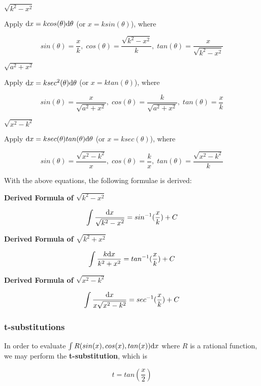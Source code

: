 \documentclass[a4paper,12pt]{article}
\begin{document}
\begin{alist}
  \item $\sqrt{k^{2}-x^{2}}$\s

  Apply $\mathrm{d} x=kcos(\theta)\mathrm{d} \theta$ (or $x=ksin(\theta)$), where

  $$sin(\theta)=\frac{x}{k},\; cos(\theta)=\frac{\sqrt{k^{2}-x^{2}}}{k},\; tan(\theta)=\frac{x}{\sqrt{k^{2}-x^{2}}}$$

  \item $\sqrt{a^{2}+x^{2}}$\s

  Apply $\mathrm{d} x=ksec^{2}(\theta)\mathrm{d} \theta$ (or $x=ktan(\theta)$), where

  $$sin(\theta)=\frac{x}{\sqrt{a^{2}+x^{2}}},\; cos(\theta)=\frac{k}{\sqrt{a^{2}+x^{2}}},\; tan(\theta)=\frac{x}{k}$$

  \item $\sqrt{x^{2}-k^{2}}$\s

  Apply $\mathrm{d} x=ksec(\theta)tan(\theta)\mathrm{d} \theta$ (or $x=ksec(\theta)$), where

  $$sin(\theta)=\frac{\sqrt{x^{2}-k^{2}}}{x},\; cos(\theta)=\frac{k}{x},\; tan(\theta)=\frac{\sqrt{x^{2}-k^{2}}}{k}$$
\end{alist}

With the above equations, the following formulae is derived:

\begin{alist}
  \item \textbf{Derived Formula of $\sqrt{k^{2}-x^{2}}$}

  $$\int\frac{\mathrm{d} x}{\sqrt{k^{2}-x^{2}}}=sin^{-1}(\frac{x}{k})+C$$

  \item \textbf{Derived Formula of $\sqrt{k^{2}+x^{2}}$}

  $$\int\frac{k\mathrm{d} x}{k^{2}+x^{2}}=tan^{-1}(\frac{x}{k})+C$$

  \item \textbf{Derived Formula of $\sqrt{x^{2}-k^{2}}$}

  $$\int\frac{\mathrm{d} x}{x\sqrt{x^{2}-k^{2}}}=sec^{-1}(\frac{x}{k})+C$$
\end{alist}

\subsubsection{t-substitutions}
In order to evaluate $\int R(sin(x),cos(x),tan(x))\mathrm{d} x$ where $R$ is a rational function, we may perform the \textbf{t-substitution}, which is

$$t=tan\left( \frac{x}{2}\right)$$\s
\end{document}
